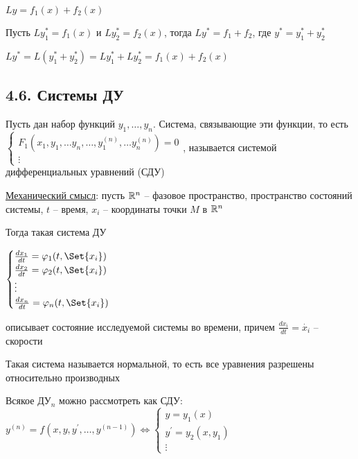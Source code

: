 \documentclass[12pt]{article}
\begin{document}
    \begin{MyTheorem}
        \Ths $Ly = f_1(x) + f_2(x)$

        Пусть $Ly_1^* = f_1(x)$ и $Ly^*_2 = f_2(x)$, тогда $Ly^* = f_1 + f_2$, где $y^* = y_1^* + y_2^*$
    \end{MyTheorem}

    \begin{MyProof}
        $Ly^* = L(y^*_1 + y^*_2) = Ly^*_1 + Ly^*_2 = f_1(x) + f_2(x)$
    \end{MyProof}

    \subsection{4.6. Системы ДУ}

    \Def Пусть дан набор функций $y_1, \dots, y_n$. Система, связывающие эти функции, то есть
    $\begin{cases}
         F_1(x_1, y_1, \dots y_n, \dots, y_1^{(n)}, \dots y_n^{(n)}) = 0 \\
         \vdots
    \end{cases}$, называется системой дифференциальных уравнений (СДУ)

    \vspace{5mm}

    \underline{Механический смысл}: пусть $\mathbb{R}^n$ -- фазовое пространство, пространство состояний системы,
    $t$ -- время, $x_i$ -- координаты точки $M$ в $\mathbb{R}^n$

    Тогда такая система ДУ

    $\begin{cases}
         \frac{dx_1}{dt} = \varphi_1(t, \Set{x_i}) \\
         \frac{dx_2}{dt} = \varphi_2(t, \Set{x_i}) \\
         \vdots \\
         \frac{dx_n}{dt} = \varphi_n(t, \Set{x_i}) \\
    \end{cases}$
        
    описывает состояние исследуемой системы во времени, причем $\frac{dx_i}{dt} = \dot{x_i}$ -- скорости

    \Nota Такая система называется нормальной, то есть все уравнения разрешены относительно производных

    \Nota Всякое ДУ$_n$ можно рассмотреть как СДУ: $y^{(n)} = f(x, y, y^\prime, \dots, y^{(n - 1)}) \Longleftrightarrow \begin{cases}y = y_1(x) \\ y^\prime = y_2(x, y_1) \\ \vdots\end{cases}$
\end{document}
